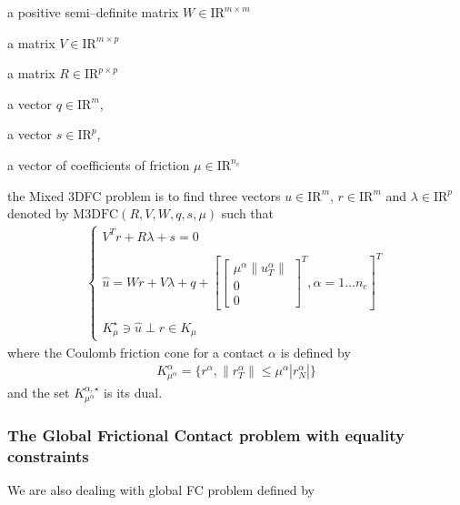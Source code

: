 \begin{DoxyItemize}
\item a positive semi--definite matrix ${W} \in {\mathrm{I\!R}}^{m \times m}$ 
\item a matrix ${V} \in {\mathrm{I\!R}}^{m \times p}$ 
\item a matrix ${R} \in {\mathrm{I\!R}}^{p \times p}$ 
\item a vector $q \in {\mathrm{I\!R}}^{m}$, 
\item a vector $s \in {\mathrm{I\!R}}^{p}$, 
\item a vector of coefficients of friction $\mu \in {\mathrm{I\!R}}^{n_c}$ 
\end{DoxyItemize}the Mixed 3\+D\+F\+C problem is to find three vectors $u\in{\mathrm{I\!R}}^m$, $r\in {\mathrm{I\!R}}^m$ and $\lambda \in {\mathrm{I\!R}}^p$ denoted by $\mathrm{M3DFC}(R,V,W,q,s,\mu)$ such that \begin{eqnarray*}\label{eq:lcp1} \begin{cases} V^T {r} + R \lambda + s = 0 \\ \\ \hat u = W {r} + V\lambda + q +\left[ \left[\begin{array}{c} \mu^\alpha \|u^\alpha_T\|\\ 0 \\ 0 \end{array}\right]^T, \alpha = 1 \ldots n_c \right]^T \\ \\ K^\star_{\mu} \ni {\hat u} \perp r \in K_{\mu} \end{cases} \end{eqnarray*} where the Coulomb friction cone for a contact $\alpha$ is defined by \begin{eqnarray*} \label{eq:CCC} K _{\mu^\alpha}^{\alpha} = \{r^\alpha, \|r^\alpha_T \| \leq \mu^\alpha |r^\alpha_N| \} \end{eqnarray*} and the set $K^{\alpha,\star}_{\mu^\alpha}$ is its dual. \hypertarget{index_globalfclib}{}\subsubsection{The Global Frictional Contact problem with equality constraints}\label{index_globalfclib}
We are also dealing with global F\+C problem defined by

